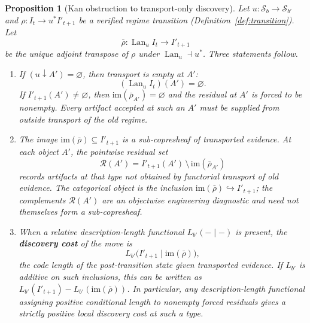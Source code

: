 \documentclass[11pt]{article}
\newtheorem{proposition}[theorem]{Proposition}
\theoremstyle{definition}
\newcommand{\Sschema}{\mathcal{S}}
\newcommand{\Lan}{\operatorname{Lan}}
\begin{document}
\begin{proposition}[Kan obstruction to transport-only discovery]
\label{prop:kan_obstruction}
Let $u:\Sschema_b\to\Sschema_{b'}$ and $\rho:I_t\to u^*I'_{t+1}$ be a verified regime transition (Definition~\ref{def:transition}). Let
\[
\bar\rho:\Lan_u I_t\longrightarrow I'_{t+1}
\]
be the unique adjoint transpose of $\rho$ under $\Lan_u\dashv u^*$. Three statements follow.
\begin{enumerate}[leftmargin=1.7em,topsep=2pt,itemsep=2pt]
    \item If $(u\downarrow A')=\varnothing$, then transport is empty at $A'$:
    \[
    (\Lan_u I_t)(A')=\varnothing .
    \]
    If $I'_{t+1}(A')\neq\varnothing$, then $\mathrm{im}(\bar\rho_{A'})=\varnothing$ and the residual at $A'$ is forced to be nonempty. Every artifact accepted at such an $A'$ must be supplied from outside transport of the old regime.
    \item The image $\mathrm{im}(\bar\rho)\subseteq I'_{t+1}$ is a sub-copresheaf of transported evidence. At each object $A'$, the pointwise residual set
    \[
    \mathcal{R}(A') = I'_{t+1}(A') \,\setminus\, \mathrm{im}(\bar\rho_{A'})
    \]
    records artifacts at that type not obtained by functorial transport of old evidence. The categorical object is the inclusion $\mathrm{im}(\bar\rho)\hookrightarrow I'_{t+1}$; the complements $\mathcal{R}(A')$ are an objectwise engineering diagnostic and need not themselves form a sub-copresheaf.
    \item When a relative description-length functional $L_{b'}(-\mid-)$ is present, the \textbf{discovery cost} of the move is
    \[
    L_{b'}\big(I'_{t+1}\mid \mathrm{im}(\bar\rho)\big),
    \]
    the code length of the post-transition state given transported evidence. If $L_{b'}$ is additive on such inclusions, this can be written as $L_{b'}(I'_{t+1})-L_{b'}(\mathrm{im}(\bar\rho))$. In particular, any description-length functional assigning positive conditional length to nonempty forced residuals gives a strictly positive local discovery cost at such a type.
\end{enumerate}
\end{proposition}
\end{document}
